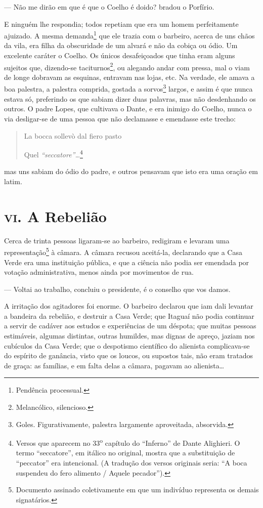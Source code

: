 --- Não me dirão em que é que o Coelho é doido? bradou o Porfírio.

E ninguém lhe respondia; todos repetiam que era um homem perfeitamente
ajuizado. A mesma demanda\footnote{Pendência processual.} que ele trazia
com o barbeiro, acerca de uns chãos da vila, era filha da obscuridade de
um alvará e não da cobiça ou ódio. Um excelente caráter o Coelho. Os
únicos desafeiçoados que tinha eram alguns sujeitos que, dizendo-se
taciturnos\footnote{Melancólico, silencioso.}, ou alegando andar com
pressa, mal o viam de longe dobravam as esquinas, entravam nas lojas,
etc. Na verdade, ele amava a boa palestra, a palestra comprida, gostada
a sorvos\footnote{Goles. Figurativamente, palestra largamente
  aproveitada, absorvida.} largos, e assim é que nunca estava só,
preferindo os que sabiam dizer duas palavras, mas não desdenhando os
outros. O padre Lopes, que cultivava o Dante, e era inimigo do Coelho,
nunca o via desligar-se de uma pessoa que não declamasse e emendasse
este trecho:

\begin{quote}
La bocca sollevò dal fiero pasto

Quel \emph{``seccatore''\ldots{}}\footnote{Versos que aparecem no
  33\textsuperscript{o} capítulo do ``Inferno'' de Dante Alighieri. O
  termo ``seccatore'', em itálico no original, mostra que a substituição
  de ``peccator'' era intencional. (A tradução dos versos originais
  seria: ``A boca suspendeu do fero alimento / Aquele pecador'').}
\end{quote}

mas uns sabiam do ódio do padre, e outros pensavam que isto era uma
oração em latim.

\section*{\textsc{vi}. A Rebelião}

Cerca de trinta pessoas ligaram-se ao barbeiro, redigiram e levaram uma
representação\footnote{Documento assinado coletivamente em que um
  indivíduo representa os demais signatários.} à câmara. A câmara
recusou aceitá-la, declarando que a Casa Verde era uma instituição
pública, e que a ciência não podia ser emendada por votação
administrativa, menos ainda por movimentos de rua.

--- Voltai ao trabalho, concluiu o presidente, é o conselho que vos
damos.

A irritação dos agitadores foi enorme. O barbeiro declarou que iam dali
levantar a bandeira da rebelião, e destruir a Casa Verde; que Itaguaí
não podia continuar a servir de cadáver aos estudos e experiências de um
déspota; que muitas pessoas estimáveis, algumas distintas, outras
humildes, mas dignas de apreço, jaziam nos cubículos da Casa Verde; que
o despotismo científico do alienista complicava-se do espírito de
ganância, visto que os loucos, ou supostos tais, não eram tratados de
graça: as famílias, e em falta delas a câmara, pagavam ao
alienista\ldots{}

